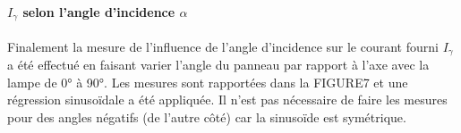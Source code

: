 \paragraph*{\(I_\gamma\) selon l'angle d'incidence \(\alpha\)}
Finalement la mesure de l'influence de l'angle d'incidence sur le courant fourni \(I_\gamma\) a été effectué en faisant varier l'angle du panneau par rapport à l'axe avec la lampe de 0° à 90°. Les mesures sont rapportées dans la FIGURE7 et une régression sinusoïdale a été appliquée. Il n'est pas nécessaire de faire les mesures pour des angles négatifs (de l'autre côté) car la sinusoïde est symétrique.






